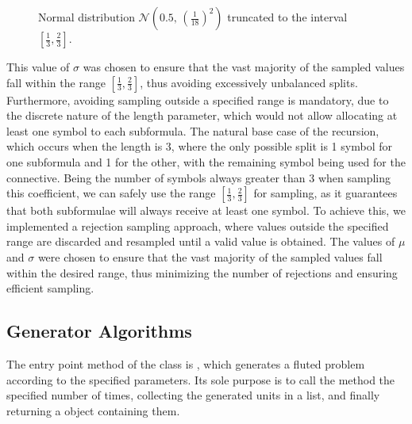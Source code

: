 \begin{figure}[H]
  \caption{Normal distribution \(\mathcal{N}(0.5,\,{(\frac{1}{18})}^2)\) truncated to the interval \([\frac{1}{3}, \frac{2}{3}]\).}\label{fig:truncated-normal-distribution}
\end{figure}

This value of \(\sigma\) was chosen to ensure that the vast majority of the sampled values fall within the range \([\frac{1}{3}, \frac{2}{3}]\), thus avoiding excessively unbalanced splits.
Furthermore, avoiding sampling outside a specified range is mandatory, due to the discrete nature of the length parameter, which would not allow allocating at least one symbol to each subformula.
The natural base case of the recursion, which occurs when the length is \(3\), where the only possible split is 1 symbol for one subformula and 1 for the other, with the remaining symbol being used for the connective.
Being the number of symbols always greater than \(3\) when sampling this coefficient, we can safely use the range \([\frac{1}{3}, \frac{2}{3}]\) for sampling, as it guarantees that both subformulae will always receive at least one symbol.
To achieve this, we implemented a rejection sampling approach, where values outside the specified range are discarded and resampled until a valid value is obtained.
The values of \(\mu\) and \(\sigma\) were chosen to ensure that the vast majority of the sampled values fall within the desired range, thus minimizing the number of rejections and ensuring efficient sampling.

\subsection{Generator Algorithms}\label{subsec:generator-algorithms}

The entry point method of the  class is , which generates a fluted problem according to the specified parameters.
Its sole purpose is to call the  method the specified number of times, collecting the generated units in a list, and finally returning a  object containing them.

